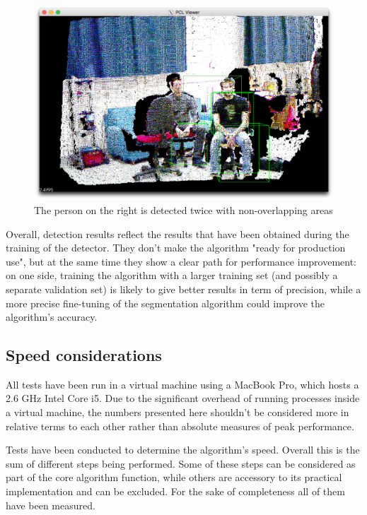 \documentclass[a4paper,11pt,titlepage]{article}
\begin{document}
\begin{figure}[h]
  \centering
  \includegraphics[scale=0.2]{multiple_detections.png}
  \caption{The person on the right is detected twice with non-overlapping
  areas}
  \label{fig:multiple_detections}
\end{figure}

Overall, detection results reflect the results that have been obtained during
the training of the detector. They don't make the algorithm "ready for
production use", but at the same time they show a clear path for performance
improvement: on one side, training the algorithm with a larger training set (and
possibly a separate validation set) is likely to give better results in term of
precision, while a more precise fine-tuning of the segmentation algorithm could
improve the algorithm's accuracy.

\subsection{Speed considerations}
All tests have been run in a virtual machine using a MacBook Pro, which hosts a
2.6 GHz Intel Core i5. Due to the significant overhead of running processes
inside a virtual machine, the numbers presented here shouldn't be considered
more in relative terms to each other rather than absolute measures of peak
performance.

Tests have been conducted to determine the algorithm's speed. Overall this is
the sum of different steps being performed. Some of these steps can be
considered as part of the core algorithm function, while others are accessory to
its practical implementation and can be excluded. For the sake of completeness
all of them have been measured.
\end{document}
